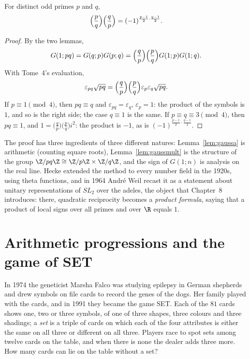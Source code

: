\begin{theorem}\label{thm:qr}
For distinct odd primes $p$ and $q$,
\[\Bigl(\frac pq\Bigr)\Bigl(\frac qp\Bigr)=(-1)^{\frac{p-1}2\cdot\frac{q-1}2}.\]
\end{theorem}
\begin{proof}
By the two lemmas,
\[G(1;pq)=G(q;p)G(p;q)=\Bigl(\frac qp\Bigr)\Bigl(\frac pq\Bigr)G(1;p)G(1;q).\]
With Tome~4's evaluation,
\[\varepsilon_{pq}\sqrt{pq}=\Bigl(\frac qp\Bigr)\Bigl(\frac pq\Bigr)\varepsilon_p\varepsilon_q\sqrt{pq}.\]
If $p\equiv1\pmod4$, then $pq\equiv q$ and $\varepsilon_{pq}=\varepsilon_q$,
$\varepsilon_p=1$: the product of the symbols is $1$, and so is the right side; the case $q\equiv1$ is the same. If $p\equiv q\equiv3\pmod 4$, then
$pq\equiv1$, and $1=\bigl(\frac qp\bigr)\bigl(\frac pq\bigr)i^2$: the product is $-1$, as is $(-1)^{\frac{p-1}2\cdot\frac{q-1}2}$.
\end{proof}

\begin{beauty}
The proof has three ingredients of three different natures: Lemma~\ref{lem:gaussa} is arithmetic (counting square roots),
Lemma~\ref{lem:gaussmult} is the structure of the group $\Z/pq\Z\cong\Z/p\Z\times\Z/q\Z$, and the sign of $G(1;n)$ is analysis on the real
line. Hecke extended the method to every number field in the 1920s, using theta functions, and in 1964 Andr\'e Weil recast it as a
statement about unitary representations of $SL_2$ over the adeles, the object that Chapter~8 introduces: there, quadratic reciprocity
becomes a \emph{product formula}, saying that a product of local signs over all primes and over $\R$ equals $1$.
\end{beauty}

\section{Arithmetic progressions and the game of SET}

In 1974 the geneticist Marsha Falco was studying epilepsy in German shepherds and drew symbols on file cards to record the genes of
the dogs. Her family played with the cards, and in 1991 they became the game SET. Each of the $81$ cards shows one, two or three
symbols, of one of three shapes, three colours and three shadings; a \emph{set} is a triple of cards on which each of the four attributes
is either the same on all three or different on all three. Players race to spot sets among twelve cards on the table, and when there
is none the dealer adds three more. How many cards can lie on the table without a set?

